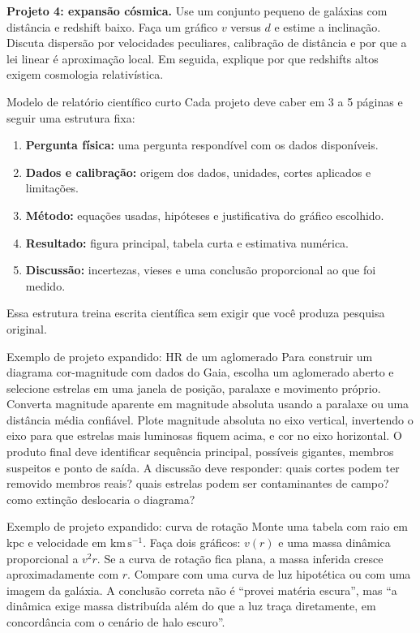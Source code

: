 \documentclass[11pt,a4paper]{article}
\begin{document}
\textbf{Projeto 4: expansão cósmica.} Use um conjunto pequeno de galáxias com distância e redshift baixo. Faça um gráfico $v$ versus $d$ e estime a inclinação. Discuta dispersão por velocidades peculiares, calibração de distância e por que a lei linear é aproximação local. Em seguida, explique por que redshifts altos exigem cosmologia relativística.

\begin{lessonblock}[borderline west={2pt}{0pt}{astroGold}]{Modelo de relatório científico curto}
Cada projeto deve caber em 3 a 5 páginas e seguir uma estrutura fixa:
\begin{enumerate}
\item \textbf{Pergunta física:} uma pergunta respondível com os dados disponíveis.
\item \textbf{Dados e calibração:} origem dos dados, unidades, cortes aplicados e limitações.
\item \textbf{Método:} equações usadas, hipóteses e justificativa do gráfico escolhido.
\item \textbf{Resultado:} figura principal, tabela curta e estimativa numérica.
\item \textbf{Discussão:} incertezas, vieses e uma conclusão proporcional ao que foi medido.
\end{enumerate}
Essa estrutura treina escrita científica sem exigir que você produza pesquisa original.
\end{lessonblock}

\begin{lessonblock}{Exemplo de projeto expandido: HR de um aglomerado}
Para construir um diagrama cor-magnitude com dados do Gaia, escolha um aglomerado aberto e selecione estrelas em uma janela de posição, paralaxe e movimento próprio. Converta magnitude aparente em magnitude absoluta usando a paralaxe ou uma distância média confiável. Plote magnitude absoluta no eixo vertical, invertendo o eixo para que estrelas mais luminosas fiquem acima, e cor no eixo horizontal. O produto final deve identificar sequência principal, possíveis gigantes, membros suspeitos e ponto de saída. A discussão deve responder: quais cortes podem ter removido membros reais? quais estrelas podem ser contaminantes de campo? como extinção deslocaria o diagrama?
\end{lessonblock}

\begin{lessonblock}{Exemplo de projeto expandido: curva de rotação}
Monte uma tabela com raio em kpc e velocidade em $\mathrm{km\,s^{-1}}$. Faça dois gráficos: $v(r)$ e uma massa dinâmica proporcional a $v^2r$. Se a curva de rotação fica plana, a massa inferida cresce aproximadamente com $r$. Compare com uma curva de luz hipotética ou com uma imagem da galáxia. A conclusão correta não é ``provei matéria escura'', mas ``a dinâmica exige massa distribuída além do que a luz traça diretamente, em concordância com o cenário de halo escuro''.
\end{lessonblock}
\end{document}
